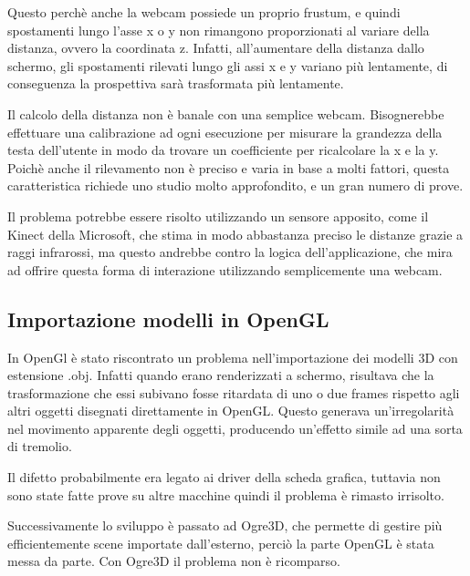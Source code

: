 Questo perchè anche la webcam possiede un proprio frustum, e quindi spostamenti lungo l'asse x o y non rimangono proporzionati al variare della distanza, ovvero la coordinata z. Infatti, all'aumentare della distanza dallo schermo, gli spostamenti rilevati lungo gli assi x e y variano più lentamente, di conseguenza la prospettiva sarà trasformata più lentamente.

Il calcolo della distanza non è banale con una semplice webcam. Bisognerebbe effettuare una calibrazione ad ogni esecuzione per misurare la grandezza della testa dell'utente in modo da trovare un coefficiente per ricalcolare la x e la y. Poichè anche il rilevamento non è preciso e varia in base a molti fattori, questa caratteristica richiede uno studio molto approfondito, e un gran numero di prove.

Il problema potrebbe essere risolto utilizzando un sensore apposito, come il Kinect della Microsoft, che stima in modo abbastanza preciso le distanze grazie a raggi infrarossi, ma questo andrebbe contro la logica dell'applicazione, che mira ad offrire questa forma di interazione utilizzando semplicemente una webcam.

\subsection{Importazione modelli in OpenGL}
In OpenGl è stato riscontrato un problema nell'importazione dei modelli 3D con estensione .obj. Infatti quando erano renderizzati a schermo, risultava che la trasformazione che essi subivano fosse ritardata di uno o due frames rispetto agli altri oggetti disegnati direttamente in OpenGL. Questo generava un'irregolarità nel movimento apparente degli oggetti, producendo un'effetto simile ad una sorta di tremolio.

Il difetto probabilmente era legato ai driver della scheda grafica, tuttavia non sono state fatte prove su altre macchine quindi il problema è rimasto irrisolto.

Successivamente lo sviluppo è passato ad Ogre3D, che permette di gestire più efficientemente scene importate dall'esterno, perciò la parte OpenGL è stata messa da parte. Con Ogre3D il problema non è ricomparso.



